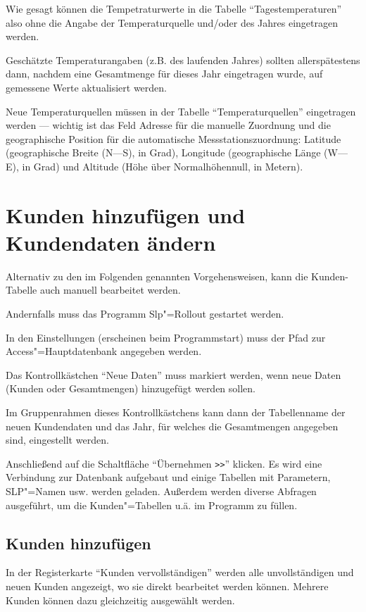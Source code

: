 Wie gesagt können die Tempetraturwerte in die Tabelle "`Tagestemperaturen"' also ohne die Angabe der Temperaturquelle und/oder des Jahres eingetragen werden.

Geschätzte Temperaturangaben (z.B. des laufenden Jahres) sollten allerspätestens dann, nachdem eine Gesamtmenge für dieses Jahr eingetragen wurde, auf gemessene Werte aktualisiert werden.

Neue Temperaturquellen müssen in der Tabelle "`Temperaturquellen"' eingetragen werden --- wichtig ist das Feld Adresse für die manuelle Zuordnung und die geographische Position für die automatische Messstationszuordnung: Latitude (geographische Breite (N---S), in Grad), Longitude (geographische Länge (W---E), in Grad) und Altitude (Höhe über Normalhöhennull, in Metern).

\section{Kunden hinzufügen und Kundendaten ändern}\label{sec:modifyclients}

Alternativ zu den im Folgenden genannten Vorgehensweisen, kann die Kunden-Tabelle auch manuell bearbeitet werden.

Andernfalls muss das Programm Slp"=Rollout gestartet werden.

In den Einstellungen (erscheinen beim Programmstart) muss der Pfad zur Access"=Hauptdatenbank angegeben werden.

Das Kontrollkästchen "`Neue Daten"' muss markiert werden, wenn neue Daten (Kunden oder Gesamtmengen) hinzugefügt werden sollen.

Im Gruppenrahmen dieses Kontrollkästchens kann dann der Tabellenname der neuen Kundendaten und das Jahr, für welches die Gesamtmengen angegeben sind, eingestellt werden.

Anschließend auf die Schaltfläche "`Übernehmen \verb|>>|"' klicken. Es wird eine Verbindung zur Datenbank aufgebaut und einige Tabellen mit Parametern, SLP"=Namen usw. werden geladen. Außerdem werden diverse Abfragen ausgeführt, um die Kunden"=Tabellen u.ä. im Programm zu füllen.

\subsection{Kunden hinzufügen}\label{sec:modifyclients/add}

In der Registerkarte "`Kunden vervollständigen"' werden alle unvollständigen und neuen Kunden angezeigt, wo sie direkt bearbeitet werden können. Mehrere Kunden können dazu gleichzeitig ausgewählt werden.


